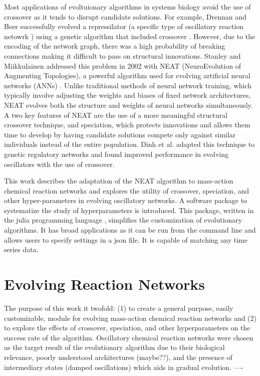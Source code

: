 \documentclass[12pt]{report}
\begin{document}
Most applications of evoltuionary algorithms in systems biology avoid the use of crossover as it tends to disrupt candidate solutions. For example, Drennan and Beer successfully evolved a repressilator (a specific type of oscillatory reaction netowrk \cite{Elowitz2000}) using a genetic algorithm that included crossover \cite{drennan_beer}. However, due to the encoding of the network graph, there was a high probability of breaking connections making it difficult to pass on structural innovations. Stanley and Miikkulainen addressed this problem in 2002 with NEAT (NeuroEvolution of Augmenting Topologies), a powerful algorithm used for evolving artificial neural networks (ANNs) \cite{stanley_evolving_2002}. Unlike traditional methods of neural network training, which typically involve adjusting the weights and biases of fixed network architectures, NEAT evolves both the structure and weights of neural networks simultaneously. A two key features of NEAT are the use of a more meaningful structural crossover technique, and speciation, which protects innovations and allows them time to develop by having candidate solutions compete only against similar individuals instead of the entire population. Dinh et al. adapted this technique to genetic regulatory networks and found improved performance in evolving oscillators with the use of crossover.

This work describes the adaptation of the NEAT algorithm to mass-action chemical reaction networks and explores the utility of crossover, speciation, and other hyper-parameters in evolving oscillatory networks. A software package to systematize the study of hyperparameters is introduced. This package, written in the julia programming language \cite{bezanson2017julia}, simplifies the customization of evolutionary algorithms. It has broad applications as it can be run from the command line and allows users to specify settings in a json file. It is capable of matching any time series data. 


\section{Evolving Reaction Networks}
The purpose of this work it twofold: (1) to create a general purpose, easily customizable, module for evolving mass-action chemical reaction networks and (2) to explore the effects of crossover,  speciation, and other hyperparameters on the success rate of the algorithm. Oscillatory chemical reaction networks were chosen as the target result of the evolutionary algorithm due to their biological relevance, poorly understood architectures (maybe??), and the presence of intermediary states (damped oscillations) which aids in gradual evolution.
----
\end{document}
